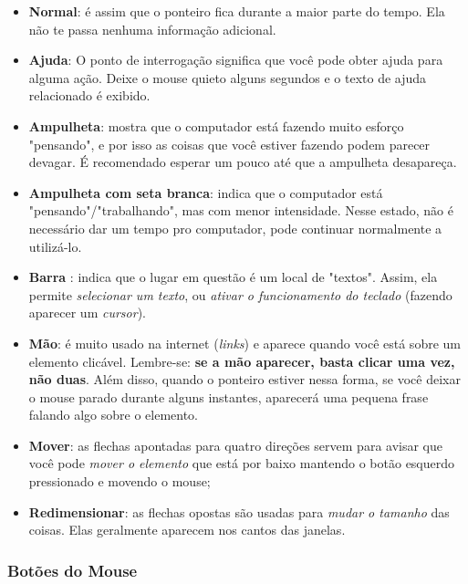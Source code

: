 \documentclass[hidelinks,12pt]{article}
\begin{document}
\begin{itemize}
	\item \textbf{Normal}: é assim que o ponteiro fica durante a maior parte do tempo. Ela não te passa nenhuma informação adicional.
	
	\item \textbf{Ajuda}: O ponto de interrogação significa que você pode obter ajuda para alguma ação. Deixe o mouse quieto alguns segundos e o texto de ajuda relacionado é exibido.
	
	\item \textbf{Ampulheta}: mostra que o computador está fazendo muito esforço "pensando", e por isso as coisas que você estiver fazendo podem parecer devagar. É recomendado esperar um pouco até que a ampulheta desapareça.
	
	\item \textbf{Ampulheta com seta branca}: indica que o computador está "pensando"/"trabalhando", mas com menor intensidade. Nesse estado, não é necessário dar um tempo pro computador, pode continuar normalmente a utilizá-lo.
	
	\item \textbf{Barra} : indica que o lugar em questão é um local de "textos". Assim, ela permite \emph{selecionar um texto}, ou \emph{ativar o funcionamento do teclado} (fazendo aparecer um \emph{cursor}).
	
	\item \textbf{Mão}: é muito usado na internet (\emph{links}) e aparece quando você está sobre um elemento clicável. Lembre-se: \textbf{se a mão aparecer, basta clicar uma vez, não duas}. Além disso, quando o ponteiro estiver nessa forma, se você deixar o mouse parado durante alguns instantes, aparecerá uma pequena frase falando algo sobre o elemento.
	
	\item \textbf{Mover}: as flechas apontadas para quatro direções servem para avisar que você pode \emph{mover o elemento} que está por baixo mantendo o botão esquerdo pressionado e movendo o mouse;
	
	\item \textbf{Redimensionar}: as flechas opostas são usadas para \emph{mudar o tamanho} das coisas. Elas geralmente aparecem nos cantos das janelas.

\end{itemize}


\subsubsection{Botões do Mouse}
\end{document}
